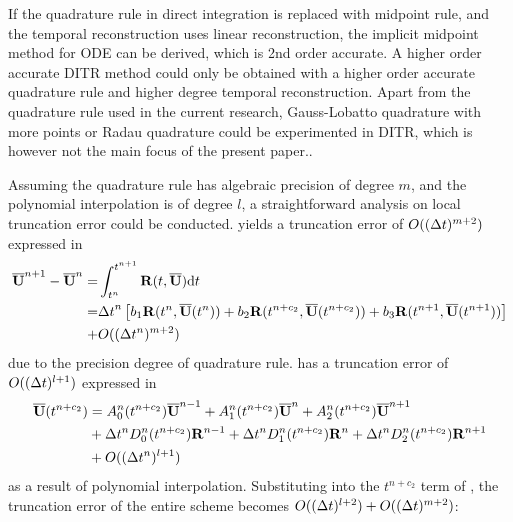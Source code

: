 If the quadrature rule in direct integration is replaced with
midpoint rule, and the temporal reconstruction uses linear
reconstruction, the implicit midpoint method for ODE can be derived,
which is 2nd order accurate. A higher order accurate DITR method could
only be obtained with a higher order accurate quadrature rule and
higher degree temporal reconstruction.
Apart from the quadrature rule used in the current research,
Gauss-Lobatto quadrature with more points or Radau quadrature
could be experimented in DITR, 
which is however not the main focus of the present paper..

Assuming the quadrature rule has algebraic precision
of degree $m$, and the polynomial interpolation is of degree $l$,
a straightforward analysis on local truncation error could be conducted.
 yields a
truncation error of $O(({\Delta} t)^{m+2} )$ expressed in 
\begin{equation}
    \label{eq:Quad3Err}
    \begin{aligned}
        \overline{\mathbf{U}}^{n+1} - \overline{\mathbf{U}}^{n} = & \int_{t^n}^{t^{n+1}}{
        \mathbf{R}(t, \overline{\mathbf{U}})\dd t}                              \\  = &
        {{\Delta} t}^{n}
        \left[
            b_1\mathbf{R}(t^n, \overline{\mathbf{U}}(t^n))
            +
            b_2\mathbf{R}(t^{n+c_2}, \overline{\mathbf{U}}(t^{n+c_2}))
            +
            b_3\mathbf{R}(t^{n+1}, \overline{\mathbf{U}}(t^{n+1}))
            \right]
        \\ + &
        O(({\Delta} t^{n})^{m+2} )
    \end{aligned}
\end{equation}
due to the precision degree of quadrature rule.
 has a truncation error of $O(({\Delta} t)^{l+1})$
expressed in 
\begin{equation}
    \begin{aligned}
        \label{eq:TRErr}
        \overline{\mathbf{U}}(t^{n+c_2}) & =
        A^n_0(t^{n+c_2})\overline{\mathbf{U}}^{n - 1} +
        A^n_1(t^{n+c_2})\overline{\mathbf{U}}^{n} +
        A^n_2(t^{n+c_2})\overline{\mathbf{U}}^{n + 1}
        \\ & +
        {\Delta} t^n D^n_0(t^{n+c_2})\mathbf{R}^{n - 1} +
        {\Delta} t^n D^n_1(t^{n+c_2})\mathbf{R}^{n} +
        {\Delta} t^n D^n_2(t^{n+c_2})\mathbf{R}^{n + 1}
        \\ & +
        O(({\Delta} t^{n})^{l+1} )
    \end{aligned}
\end{equation}
as a result of polynomial interpolation.
Substituting  into the $t^{n+c_2}$ term
of , the truncation error
of the entire scheme becomes $O(({\Delta} t)^{l+2}) + O(({\Delta} t)^{m+2})$:
